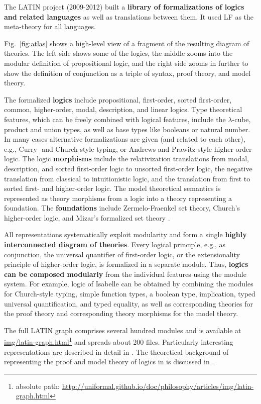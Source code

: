 The LATIN project \cite{CHKMR:latinabs:11,project:latin} (2009-2012) built a \textbf{library of formalizations of logics and related languages} as well as translations between them.
It used LF as the meta-theory for all languages.

Fig.~\ref{fig:atlas} shows a high-level view of a fragment of the resulting diagram of \mmt theories.
The left side shows some of the logics, the middle zooms into the modular definition of propositional logic, and the right side zooms in further to show the definition of conjunction as a triple of syntax, proof theory, and model theory.

The formalized \textbf{logics} include propositional, first-order, sorted first-order, common, higher-order, modal, description, and linear logics.
Type theoretical features, which can be freely combined with logical features, include the $\lambda$-cube, product and union types, as well as base types like booleans or natural number.
In many cases alternative formalizations are given (and related to each other), e.g., Curry- and Church-style typing, or Andrews and Prawitz-style higher-order logic.
The logic \textbf{morphisms} include the relativization translations from modal, description, and sorted first-order logic to unsorted first-order logic,
the negative translation from classical to intuitionistic logic, and the translation from first to sorted first- and higher-order logic.
The model theoretical semantics is represented as theory morphisms from a logic into a theory representing a foundation.
The \textbf{foundations} include Zermelo-Fraenkel set theory, Church's higher-order logic, and Mizar's formalized set theory \cite{mizar}.

All representations systematically exploit modularity and form a single \textbf{highly interconnected diagram of \mmt theories}.
Every logical principle, e.g., as conjunction, the universal quantifier of first-order logic, or the extensionality principle of higher-order logic, is formalized in a separate module.
Thus, \textbf{logics can be composed modularly} from the individual features using the {\mmt} module system.
For example, logic of Isabelle \cite{isabelle} can be obtained by combining the modules for Church-style typing, simple function types, a boolean type, implication, typed universal quantification, and typed equality, as well as corresponding theories for the proof theory and corresponding theory morphisms for the model theory.

The full LATIN graph comprises several hundred modules and is available at \url{img/latin-graph.html}\footnote{absolute path: \url{http://uniformal.github.io/doc/philosophy/articles/img/latin-graph.html}} and spreads about 200 files.
Particularly interesting representations are described in detail in \cite{IR:foundations:10,HR:folsound:10,BRS:tptphol:08}.
The theoretical background of representing the proof and model theory of logics in \mmt is discussed in \cite{rabe:combining:10,rabe:howto:14}.

